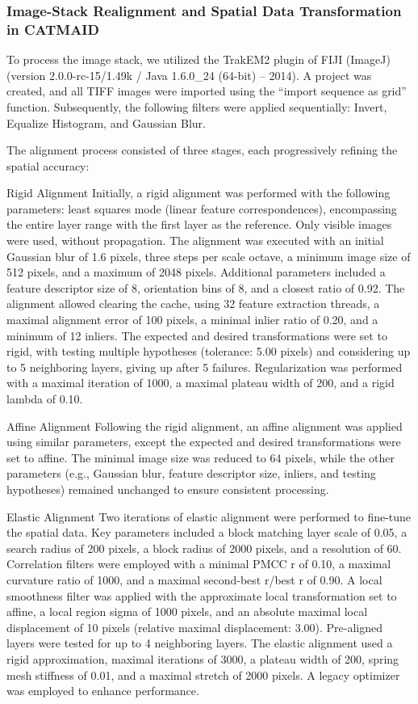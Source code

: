 \documentclass[
  11pt,
]{article}
\begin{document}
\subsubsection{Image-Stack Realignment and Spatial Data Transformation
in
CATMAID}\label{image-stack-realignment-and-spatial-data-transformation-in-catmaid}

To process the image stack, we utilized the TrakEM2 plugin of FIJI
(ImageJ) (version 2.0.0-rc-15/1.49k / Java 1.6.0\_24 (64-bit) -- 2014).
A project was created, and all TIFF images were imported using the
``import sequence as grid'' function. Subsequently, the following
filters were applied sequentially: Invert, Equalize Histogram, and
Gaussian Blur.

The alignment process consisted of three stages, each progressively
refining the spatial accuracy:

Rigid Alignment Initially, a rigid alignment was performed with the
following parameters: least squares mode (linear feature
correspondences), encompassing the entire layer range with the first
layer as the reference. Only visible images were used, without
propagation. The alignment was executed with an initial Gaussian blur of
1.6 pixels, three steps per scale octave, a minimum image size of 512
pixels, and a maximum of 2048 pixels. Additional parameters included a
feature descriptor size of 8, orientation bins of 8, and a closest ratio
of 0.92. The alignment allowed clearing the cache, using 32 feature
extraction threads, a maximal alignment error of 100 pixels, a minimal
inlier ratio of 0.20, and a minimum of 12 inliers. The expected and
desired transformations were set to rigid, with testing multiple
hypotheses (tolerance: 5.00 pixels) and considering up to 5 neighboring
layers, giving up after 5 failures. Regularization was performed with a
maximal iteration of 1000, a maximal plateau width of 200, and a rigid
lambda of 0.10.

Affine Alignment Following the rigid alignment, an affine alignment was
applied using similar parameters, except the expected and desired
transformations were set to affine. The minimal image size was reduced
to 64 pixels, while the other parameters (e.g., Gaussian blur, feature
descriptor size, inliers, and testing hypotheses) remained unchanged to
ensure consistent processing.

Elastic Alignment Two iterations of elastic alignment were performed to
fine-tune the spatial data. Key parameters included a block matching
layer scale of 0.05, a search radius of 200 pixels, a block radius of
2000 pixels, and a resolution of 60. Correlation filters were employed
with a minimal PMCC r of 0.10, a maximal curvature ratio of 1000, and a
maximal second-best r/best r of 0.90. A local smoothness filter was
applied with the approximate local transformation set to affine, a local
region sigma of 1000 pixels, and an absolute maximal local displacement
of 10 pixels (relative maximal displacement: 3.00). Pre-aligned layers
were tested for up to 4 neighboring layers. The elastic alignment used a
rigid approximation, maximal iterations of 3000, a plateau width of 200,
spring mesh stiffness of 0.01, and a maximal stretch of 2000 pixels. A
legacy optimizer was employed to enhance performance.
\end{document}

